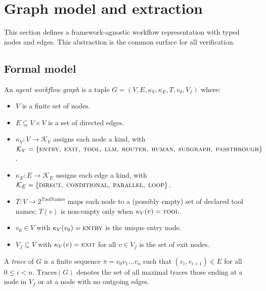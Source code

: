 \section{Graph model and extraction}
\label{sec:graph_model}

This section defines a framework-agnostic workflow representation with typed nodes
and edges. This abstraction is the common surface for all verification.

\subsection{Formal model}

\begin{definition}
\label{def:awg}
An \emph{agent workflow graph} is a tuple
$G = (V, E, \kappa_V, \kappa_E, T, v_0, V_f)$ where:
\begin{itemize}
  \item $V$ is a finite set of nodes.
  \item $E \subseteq V \times V$ is a set of directed edges.
  \item $\kappa_V: V \to \mathcal{K}_V$ assigns each node a kind, with\\
    $\mathcal{K}_V = \{\textsc{entry},\; \textsc{exit},\;
    \textsc{tool},\; \textsc{llm},\; \textsc{router},\;
    \textsc{human},\; \textsc{subgraph},\;
    \textsc{passthrough}\}$.
  \item $\kappa_E: E \to \mathcal{K}_E$ assigns each edge a kind, with\\
    $\mathcal{K}_E = \{\textsc{direct},\; \textsc{conditional},\;
    \textsc{parallel},\; \textsc{loop}\}$.
  \item $T: V \to 2^{\text{ToolNames}}$ maps each node to a (possibly
    empty) set of declared tool names; $T(v)$ is non-empty only when
    $\kappa_V(v) = \textsc{tool}$.
  \item $v_0 \in V$ with $\kappa_V(v_0) = \textsc{entry}$ is the unique
    entry node.
  \item $V_f \subseteq V$ with $\kappa_V(v) = \textsc{exit}$ for all
    $v \in V_f$ is the set of exit nodes.
\end{itemize}
\end{definition}

\begin{definition}
\label{def:trace}
A \emph{trace} of $G$ is a finite sequence $\pi = v_0 v_1 \ldots v_n$
such that $(v_i, v_{i+1}) \in E$ for all $0 \le i < n$.
$\mathrm{Traces}(G)$ denotes the set of all maximal traces those
ending at a node in $V_f$ or at a node with no outgoing edges.
\end{definition}

